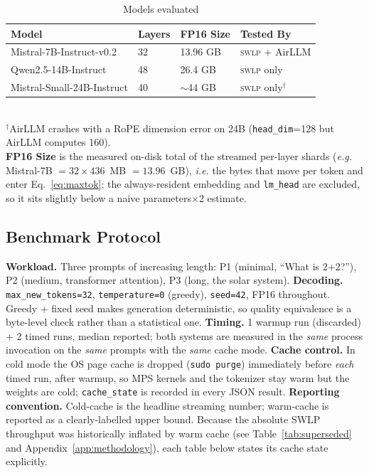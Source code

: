 \documentclass[10pt,a4paper]{article}
\newcommand{\swlp}{\textsc{swlp}}
\newcommand{\ie}{\textit{i.e.}}
\newcommand{\eg}{\textit{e.g.}}
\begin{document}
\begin{table}[htbp]
\centering
\caption{Models evaluated}
\label{tab:models}
\begin{tabular}{@{}llll@{}}
\toprule
\textbf{Model} & \textbf{Layers} & \textbf{FP16 Size} & \textbf{Tested By} \\
\midrule
Mistral-7B-Instruct-v0.2 & 32 & 13.96 GB & \swlp{} + AirLLM \\
Qwen2.5-14B-Instruct & 48 & 26.4 GB & \swlp{} only \\
Mistral-Small-24B-Instruct & 40 & $\sim$44 GB & \swlp{} only$^\dagger$ \\
\bottomrule
\end{tabular}
\\[0.3em]
{\small $^\dagger$AirLLM crashes with a RoPE dimension error on 24B
(\texttt{head\_dim}=128 but AirLLM computes 160).}
\\[0.2em]
{\small \textbf{FP16 Size} is the measured on-disk total of the streamed per-layer
shards (\eg{} Mistral-7B $= 32 \times 436$~MB $= 13.96$~GB), \ie{} the bytes that
move per token and enter Eq.~\ref{eq:maxtok}; the always-resident embedding and
\texttt{lm\_head} are excluded, so it sits slightly below a naive
parameters$\times 2$ estimate.}
\end{table}

\subsection{Benchmark Protocol}
\label{subsec:protocol}

\textbf{Workload.} Three prompts of increasing length: P1 (minimal, ``What is
2+2?''), P2 (medium, transformer attention), P3 (long, the solar system).
\textbf{Decoding.} \texttt{max\_new\_tokens=32}, \texttt{temperature=0} (greedy),
\texttt{seed=42}, FP16 throughout. Greedy + fixed seed makes generation
deterministic, so quality equivalence is a byte-level check rather than a
statistical one. \textbf{Timing.} 1 warmup run (discarded) + 2 timed runs, median
reported; both systems are measured in the \emph{same} process invocation on the
\emph{same} prompts with the \emph{same} cache mode. \textbf{Cache control.} In
cold mode the OS page cache is dropped (\texttt{sudo purge}) immediately before
\emph{each} timed run, after warmup, so MPS kernels and the tokenizer stay warm
but the weights are cold; \texttt{cache\_state} is recorded in every JSON result.
\textbf{Reporting convention.} Cold-cache is the headline streaming number;
warm-cache is reported as a clearly-labelled upper bound. Because the
absolute SWLP throughput was historically inflated by warm cache (see
Table~\ref{tab:superseded} and Appendix~\ref{app:methodology}), each table below
states its cache state explicitly.
\end{document}
